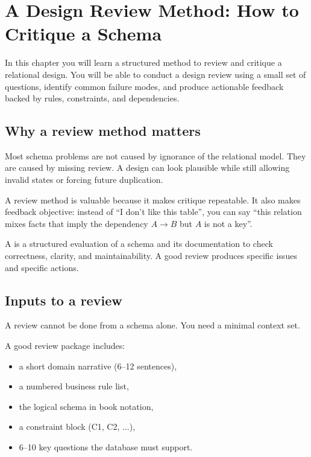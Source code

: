 \chapter{A Design Review Method: How to Critique a Schema}

\begin{learningobjectives}
In this chapter you will learn a structured method to review and critique a relational design.
You will be able to conduct a design review using a small set of questions, identify common failure modes, and produce actionable feedback backed by rules, constraints, and dependencies.
\end{learningobjectives}

\section{Why a review method matters}
Most schema problems are not caused by ignorance of the relational model.
They are caused by missing review.
A design can look plausible while still allowing invalid states or forcing future duplication.

A review method is valuable because it makes critique repeatable.
It also makes feedback objective: instead of “I don’t like this table”, you can say “this relation mixes facts that imply the dependency \(A \rightarrow B\) but \(A\) is not a key”.

\begin{definitionbox}
A  is a structured evaluation of a schema and its documentation to check correctness, clarity, and maintainability.
A good review produces specific issues and specific actions.
\end{definitionbox}

\section{Inputs to a review}
A review cannot be done from a schema alone.
You need a minimal context set.

A good review package includes:
\begin{itemize}[leftmargin=*,nosep]
  \item a short domain narrative (6--12 sentences),
  \item a numbered business rule list,
  \item the logical schema in book notation,
  \item a constraint block (C1, C2, ...),
  \item 6--10 key questions the database must support.
\end{itemize}


